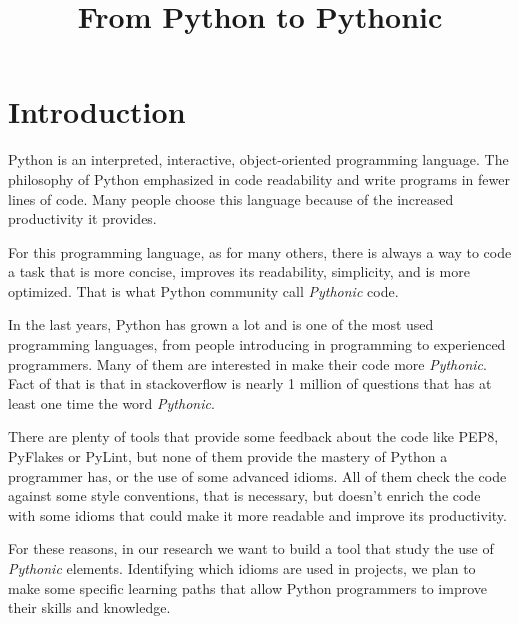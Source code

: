 \documentclass[conference]{IEEEtran}
\begin{document}
\title{From Python to Pythonic}


\author{
\and
{}
}


\maketitle
\IEEEpeerreviewmaketitle

\section{Introduction}

Python is an interpreted, interactive, object-oriented programming language. The philosophy of Python emphasized in code readability and write programs in fewer lines of code. Many people choose this language because of the increased productivity it provides.

For this programming language, as for many others, there is always a way to code a task that is more concise, improves its readability, simplicity, and is more optimized. That is what Python community call \emph{Pythonic} code.

In the last years, Python has grown a lot and is one of the most used programming languages, from people introducing in programming to experienced programmers. Many of them are interested in make their code more \emph{Pythonic}. Fact of that is that in stackoverflow is nearly 1 million of questions that has at least one time the word \emph{Pythonic}.

There are plenty of tools that provide some feedback about the code like PEP8, PyFlakes or PyLint, but none of them provide the mastery of Python a programmer has, or the use of some advanced idioms. All of them check the code against some style conventions, that is necessary, but doesn't enrich the code with some idioms that could make it more readable and improve its productivity.

For these reasons, in our research we want to build a tool that study the use of \emph{Pythonic} elements. Identifying which idioms are used in projects, we plan to make some specific learning paths that allow Python programmers to improve their skills and knowledge.
\end{document}
